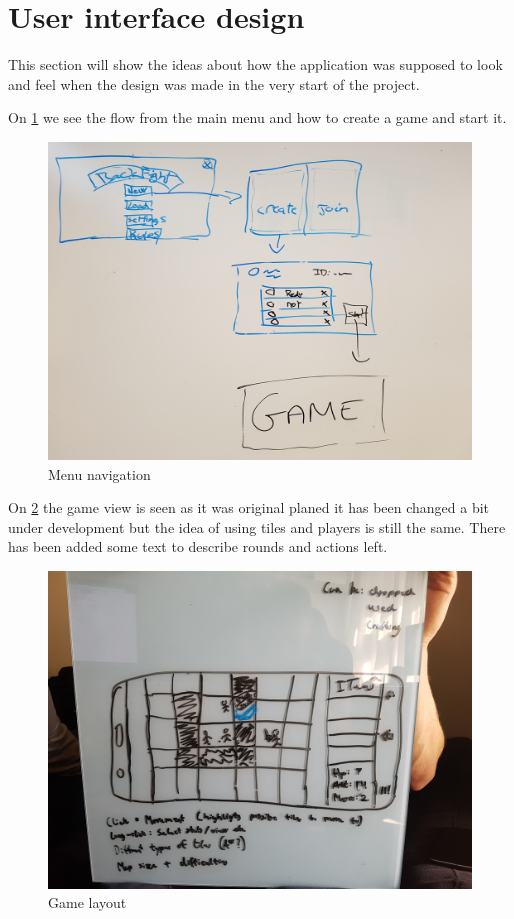 \section{User interface design}
This section will show the ideas about how the application was supposed to look and feel when the design was made in the very start of the project.

On \ref{navigation} we see the flow from the main menu and how to create a game and start it.

\begin{figure}
	\centering
	\includegraphics[width=130mm]{images/Gui.png}
	\caption{Menu navigation \label{navigation}}
\end{figure}


On \ref{gameLayout} the game view is seen as it was original planed it has been changed a bit under development but the idea of using tiles and players is still the same. There has been added some text to describe rounds and actions left.

\begin{figure}
	\centering
	\includegraphics[width=130mm]{images/GameView.png}
	\caption{Game layout \label{gameLayout}}
\end{figure}

